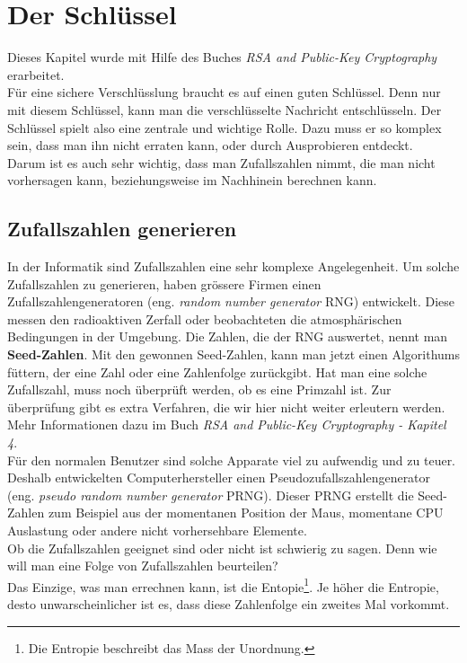 \newpage
\section{Der Schlüssel}
Dieses Kapitel wurde mit Hilfe des Buches \textit{RSA and Public-Key Cryptography} erarbeitet.\\[2ex]
%
Für eine sichere Verschlüsslung braucht es auf einen guten Schlüssel. Denn nur mit diesem Schlüssel, kann man die verschlüsselte Nachricht entschlüsseln. Der Schlüssel spielt also eine zentrale und wichtige Rolle. Dazu muss er so komplex sein, dass man ihn nicht erraten kann, oder durch Ausprobieren entdeckt.\\
Darum ist es auch sehr wichtig, dass man Zufallszahlen nimmt, die man nicht vorhersagen kann, beziehungsweise im Nachhinein berechnen kann.
%
\subsection{Zufallszahlen generieren}
In der Informatik sind Zufallszahlen eine sehr komplexe Angelegenheit. Um solche Zufallszahlen zu generieren, haben grössere Firmen einen Zufallszahlengeneratoren (eng. \textit{random number generator} RNG) entwickelt. Diese messen den radioaktiven Zerfall oder beobachteten die atmosphärischen Bedingungen in der Umgebung. Die Zahlen, die der RNG auswertet, nennt man \textbf{Seed-Zahlen}. Mit den gewonnen Seed-Zahlen, kann man jetzt einen Algorithums füttern, der eine Zahl oder eine Zahlenfolge zurückgibt. Hat man eine solche Zufallszahl, muss noch überprüft werden, ob es eine Primzahl ist. Zur überprüfung gibt es extra Verfahren, die wir hier nicht weiter erleutern werden. Mehr Informationen dazu im Buch \textit{RSA and Public-Key Cryptography - Kapitel 4}.\\
%
Für den normalen Benutzer sind solche Apparate viel zu aufwendig und zu teuer. Deshalb entwickelten Computerhersteller einen Pseudozufallszahlengenerator (eng. \textit{pseudo random number generator} PRNG). Dieser PRNG erstellt die Seed-Zahlen zum Beispiel aus der momentanen Position der Maus, momentane CPU Auslastung oder andere nicht vorhersehbare Elemente.\\
Ob die Zufallszahlen geeignet sind oder nicht ist schwierig zu sagen. Denn wie will man eine Folge von Zufallszahlen beurteilen?\\
Das Einzige, was man errechnen kann, ist die Entopie\footnote{Die Entropie beschreibt das Mass der Unordnung.}. Je höher die Entropie, desto unwarscheinlicher ist es, dass diese Zahlenfolge ein zweites Mal vorkommt.
